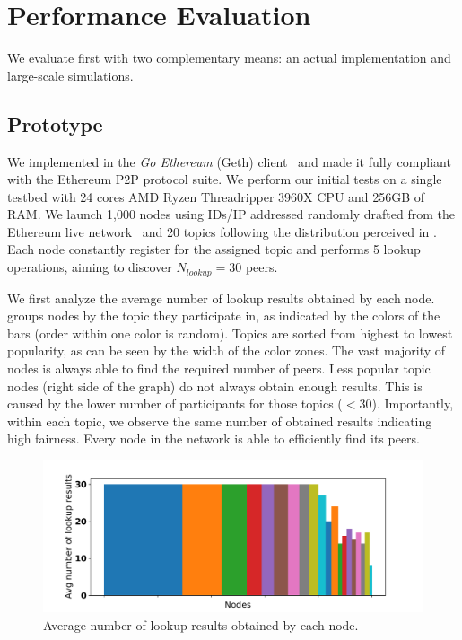 
\vspace{-0.5mm}
\section{Performance Evaluation}
\label{sec:eval}
\vspace{-2mm}

We evaluate \sysname first with two complementary means: an actual implementation and large-scale simulations.

\subsection{Prototype}

We implemented \sysname in the \emph{Go Ethereum} (Geth) client~\cite{geth} and made it fully compliant with the Ethereum P2P protocol suite. 
We perform our initial tests on a single testbed with 24 cores AMD Ryzen Threadripper 3960X CPU and 256GB of RAM.
We launch 1,000 nodes using IDs/IP addressed randomly drafted from the Ethereum live network~\cite{discv4-dns-lists} and 20 topics following the distribution perceived in .
Each node constantly register for the assigned topic and performs 5 lookup operations, aiming to discover $N_\textit{lookup}=30$ peers.

We first analyze the average number of lookup results obtained by each node. 
 groups nodes by the topic they participate in, as indicated by the colors of the bars (order within one color is random).
Topics are sorted from highest to lowest popularity, as can be seen by the width of the color zones.
The vast majority of nodes is always able to find the required number of peers.
Less popular topic nodes (right side of the graph) do not always obtain enough results.
This is caused by the lower number of participants for those topics ($< 30$).
Importantly, within each topic, we observe the same number of obtained results indicating high fairness.
Every node in the network is able to efficiently find its peers.

\begin{figure}
\centering
\includegraphics[width=\linewidth]{results/testbed/testbed_discovered_search.pdf}
\caption{\label{fig:testbed_discovered_search}Average number of lookup results obtained by each node.}
\vspace{-0.15in}
\end{figure}

